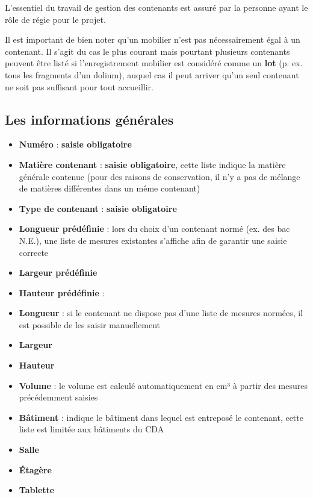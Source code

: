 \documentclass[letterpaper,10pt,french]{sphinxmanual}
\begin{document}
L'essentiel du travail de gestion des contenants est assuré par la personne ayant le rôle de régie pour le projet.

Il est important de bien noter qu'un mobilier n'est pas nécessairement égal à un contenant. Il s'agit du cas le plus courant mais pourtant plusieurs contenants peuvent être listé si l'enregistrement mobilier est considéré comme un \textbf{lot} (p. ex. tous les fragments d'un dolium), auquel cas il peut arriver qu'un seul contenant ne soit pas suffisant pour tout accueillir.


\subsection{Les informations générales}
\label{manuel/formulaire_contenant:les-informations-generales}\begin{itemize}
\item {} 
\textbf{Numéro} : \textbf{saisie obligatoire}

\item {} 
\textbf{Matière contenant} : \textbf{saisie obligatoire}, cette liste indique la matière générale contenue (pour des raisons de conservation, il n'y a pas de mélange de matières différentes dans un même contenant)

\item {} 
\textbf{Type de contenant} : \textbf{saisie obligatoire}

\item {} 
\textbf{Longueur prédéfinie} : lors du choix d'un contenant normé (ex. des bac N.E.), une liste de mesures existantes s'affiche afin de garantir une saisie correcte

\item {} 
\textbf{Largeur prédéfinie}

\item {} 
\textbf{Hauteur prédéfinie} :

\item {} 
\textbf{Longueur} : si le contenant ne dispose pas d'une liste de mesures normées, il est possible de les saisir manuellement

\item {} 
\textbf{Largeur}

\item {} 
\textbf{Hauteur}

\item {} 
\textbf{Volume} : le volume est calculé automatiquement en cm³ à partir des mesures précédemment saisies

\item {} 
\textbf{Bâtiment} : indique le bâtiment dans lequel est entreposé le contenant, cette liste est limitée aux bâtiments du CDA

\item {} 
\textbf{Salle}

\item {} 
\textbf{Étagère}

\item {} 
\textbf{Tablette}

\end{itemize}
\end{document}
